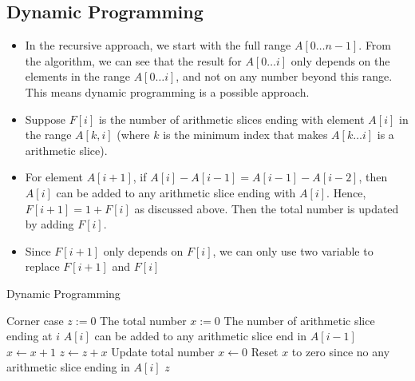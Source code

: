 \subsection{Dynamic Programming}
\begin{itemize}
\item In the recursive approach, we start with the full range $A[0\ldots n-1]$. From the algorithm, we can see that the result for $A[0\ldots i]$ only depends on the elements in the range $A[0\ldots i]$, and not on any number beyond this range. This means dynamic programming is a possible approach.
\item Suppose $F[i]$ is the number of arithmetic slices ending with element $A[i]$ in the range $A[k, i]$ (where $k$ is the minimum index that makes $A[k\ldots i]$ is a arithmetic slice).
\item For element $A[i+1]$, if $A[i] - A[i-1] = A[i-1] - A[i-2]$, then $A[i]$ can be added to any arithmetic slice ending with $A[i]$. Hence, $F[i+1] = 1 + F[i]$ as discussed above. Then the total number is updated by adding $F[i]$.
\item Since $F[i+1]$ only depends on $F[i]$, we can only use two variable to replace $F[i+1]$ and $F[i]$
\end{itemize}

\begin{algorithm}[H]
\caption{Dynamic Programming}
\begin{algorithmic}[1]
 \Comment Corner case
\State {}
\EndIf
\State $z:=0$ \Comment The total number
\State $x:=0$ \Comment The number of arithmetic slice ending at $i$
\State $A[i]$ can be added to any arithmetic slice end in $A[i-1]$
\State $x\gets x+1$
\State $z\gets z+x$ \Comment Update total number
\Else
\State $x\gets 0$ \Comment Reset $x$ to zero since no any arithmetic slice ending in $A[i]$
\EndIf
\EndFor
\State \Return $ z $
\EndProcedure
\end{algorithmic}
\end{algorithm}
